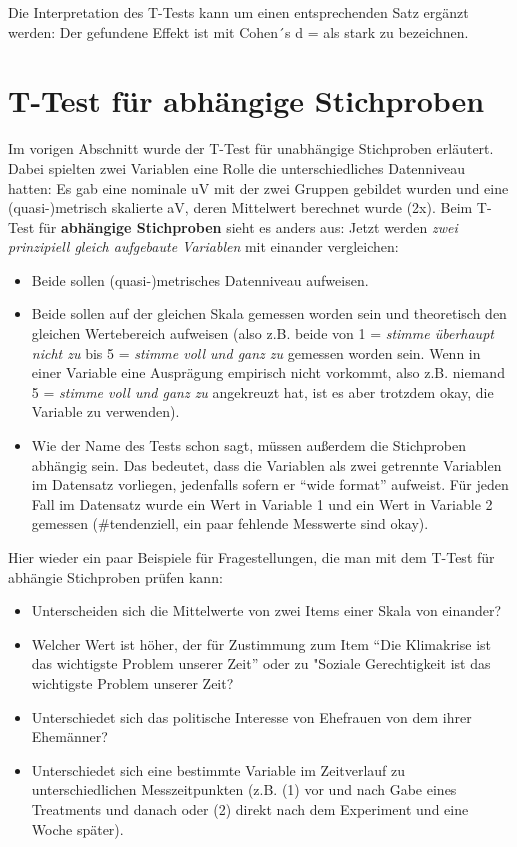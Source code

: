\documentclass[
]{book}
\begin{document}
Die Interpretation des T-Tests kann um einen entsprechenden Satz ergänzt werden: Der gefundene Effekt ist mit Cohen´s d =  als stark zu bezeichnen.

\hypertarget{t-test-fuxfcr-abhuxe4ngige-stichproben}{%
\section{T-Test für abhängige Stichproben}\label{t-test-fuxfcr-abhuxe4ngige-stichproben}}

Im vorigen Abschnitt wurde der T-Test für unabhängige Stichproben erläutert. Dabei spielten zwei Variablen eine Rolle die unterschiedliches Datenniveau hatten: Es gab eine nominale uV mit der zwei Gruppen gebildet wurden und eine (quasi-)metrisch skalierte aV, deren Mittelwert berechnet wurde (2x). Beim T-Test für \textbf{abhängige Stichproben} sieht es anders aus: Jetzt werden \emph{zwei prinzipiell gleich aufgebaute Variablen} mit einander vergleichen:

\begin{itemize}
\item
  Beide sollen (quasi-)metrisches Datenniveau aufweisen.
\item
  Beide sollen auf der gleichen Skala gemessen worden sein und theoretisch den gleichen Wertebereich aufweisen (also z.B. beide von 1 = \emph{stimme überhaupt nicht zu} bis 5 = \emph{stimme voll und ganz zu} gemessen worden sein. Wenn in einer Variable eine Ausprägung empirisch nicht vorkommt, also z.B. niemand 5 = \emph{stimme voll und ganz zu} angekreuzt hat, ist es aber trotzdem okay, die Variable zu verwenden).
\item
  Wie der Name des Tests schon sagt, müssen außerdem die Stichproben abhängig sein. Das bedeutet, dass die Variablen als zwei getrennte Variablen im Datensatz vorliegen, jedenfalls sofern er ``wide format'' aufweist. Für jeden Fall im Datensatz wurde ein Wert in Variable 1 und ein Wert in Variable 2 gemessen (\#tendenziell, ein paar fehlende Messwerte sind okay).
\end{itemize}

Hier wieder ein paar Beispiele für Fragestellungen, die man mit dem T-Test für abhängie Stichproben prüfen kann:

\begin{itemize}
\item
  Unterscheiden sich die Mittelwerte von zwei Items einer Skala von einander?
\item
  Welcher Wert ist höher, der für Zustimmung zum Item ``Die Klimakrise ist das wichtigste Problem unserer Zeit'' oder zu "Soziale Gerechtigkeit ist das wichtigste Problem unserer Zeit?
\item
  Unterschiedet sich das politische Interesse von Ehefrauen von dem ihrer Ehemänner?
\item
  Unterschiedet sich eine bestimmte Variable im Zeitverlauf zu unterschiedlichen Messzeitpunkten (z.B. (1) vor und nach Gabe eines Treatments und danach oder (2) direkt nach dem Experiment und eine Woche später).
\end{itemize}
\end{document}
